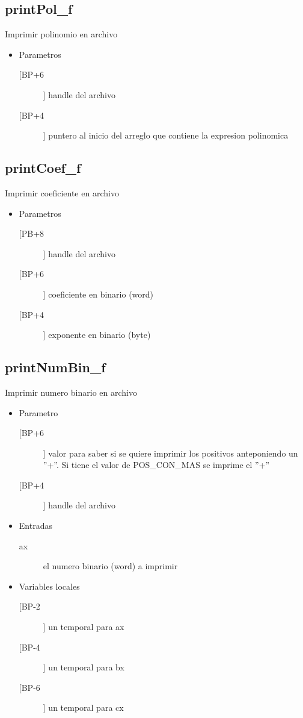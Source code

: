 \subsection{printPol\_f}
\label{sec-4-1}
Imprimir polinomio en archivo
\begin{itemize}
\item Parametros
\begin{description}
\item[[BP+6]] handle del archivo
\item[[BP+4]] puntero al inicio del arreglo que contiene la
expresion polinomica
\end{description}
\end{itemize}

\subsection{printCoef\_f}
\label{sec-4-2}
Imprimir coeficiente en archivo
\begin{itemize}
\item Parametros
\begin{description}
\item[[PB+8]] handle del archivo
\item[[BP+6]] coeficiente en binario (word)
\item[[BP+4]] exponente en binario (byte)
\end{description}
\end{itemize}

\subsection{printNumBin\_f}
\label{sec-4-3}
Imprimir numero binario en archivo
\begin{itemize}
\item Parametro
\begin{description}
\item[[BP+6]] valor para saber si se quiere imprimir los
positivos anteponiendo un ''+''. Si tiene el
valor de POS\_CON\_MAS se imprime el ''+''
\item[[BP+4]] handle del archivo
\end{description}
\item Entradas
\begin{description}
\item[ax] el numero binario (word) a imprimir
\end{description}
\item Variables locales
\begin{description}
\item[[BP-2]] un temporal para ax
\item[[BP-4]] un temporal para bx
\item[[BP-6]] un temporal para cx
\end{description}
\end{itemize}

